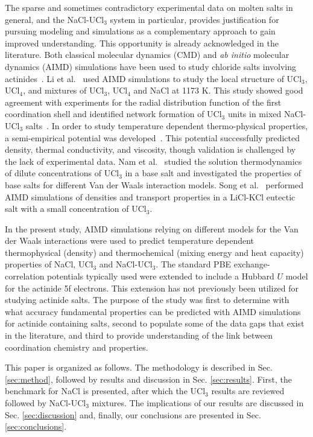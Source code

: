 \documentclass[preprint,3p,10pt,onecolumn,number,sort&compress]{elsarticle}
\begin{document}
The sparse and sometimes contradictory experimental data on molten salts in general, and the NaCl-UCl$_3$ system in particular, provides justification for pursuing modeling and simulations as a complementary approach to gain improved understanding. This opportunity is already acknowledged  in the literature. Both classical molecular dynamics (CMD) and \textit{ab initio} molecular dynamics (AIMD) simulations have been used to study chloride salts involving actinides~\cite{Li,Li2020,Nam2015,SONG}. Li et al.~\cite{Li} used AIMD simulations to study the local structure of UCl$_3$, UCl$_4$, and mixtures of UCl$_3$, UCl$_4$ and NaCl at 1173 K. This study showed good agreement with experiments for the radial distribution function of the first coordination shell and identified network formation of UCl$_3$ units in mixed NaCl-UCl$_3$ salts~\cite{Li}. %
In order to study temperature dependent thermo-physical properties, a semi-empirical potential was developed~\cite{Li2020}. This potential successfully predicted density, thermal conductivity, and viscosity, though validation is challenged by the lack of experimental data. Nam et al.~\cite{Nam2015} studied the solution thermodynamics of dilute concentrations of UCl$_3$ in a base salt and investigated the properties of base salts for different Van der Waals interaction models. Song et al.~\cite{SONG} performed AIMD simulations of densities and transport properties in a LiCl-KCl eutectic salt with a small concentration of UCl$_3$. 

In the present study, AIMD simulations relying on different models for the Van der Waals interactions were used to predict temperature dependent thermophysical (density) and thermochemical (mixing energy and heat capacity) properties of NaCl, UCl$_3$ and NaCl-UCl$_3$. The standard PBE exchange-correlation potentials typically used were extended to include a Hubbard $U$ model for the actinide 5f electrons. This extension has not previously been utilized for studying actinide salts. The purpose of the study was first to determine with what accuracy fundamental properties can be predicted with AIMD simulations for actinide containing salts, second to populate some of the data gaps that exist in the literature, and third to provide understanding of the link between coordination chemistry and properties. 

This paper is organized as follows. The methodology is described in Sec. \ref{sec:method}, followed by results and discussion in Sec. \ref{sec:results}. First, the benchmark for NaCl is presented, after which the UCl$_3$ results are reviewed followed by NaCl-UCl$_3$ mixtures. The implications of our results are discussed in Sec. \ref{sec:discussion} and, finally, our conclusions are presented in Sec. \ref{sec:conclusions}. 
\end{document}
